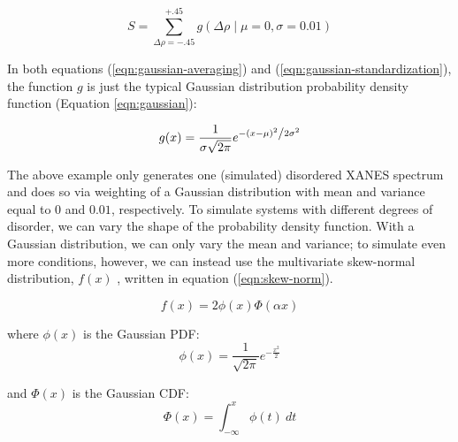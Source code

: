 \begin{equation}
	\label{eqn:gaussian-standardization}
	S = \sum_{\Delta\rho=-.45}^{+.45} g\left(\Delta \rho \mid \mu=0, \sigma=0.01\right)
\end{equation}

\noindent
In both equations (\ref{eqn:gaussian-averaging}) and (\ref{eqn:gaussian-standardization}), the function $ g $ is just the typical Gaussian distribution probability density function (Equation \ref{eqn:gaussian}): 

\begin{equation}
	\label{eqn:gaussian}
	g(x) = \frac{1}{{\sigma \sqrt {2\pi } }}e^{{{ - \left( {x - \mu } \right)^2 } \mathord{\left/ {\vphantom {{ - \left( {x - \mu } \right)^2 } {2\sigma ^2 }}} \right. \kern-\nulldelimiterspace} {2\sigma ^2 }}}
\end{equation}

The above example only generates one (simulated) disordered XANES spectrum and does so via weighting of a Gaussian distribution with mean and variance equal to $ 0 $ and $ 0.01 $, respectively. To simulate systems with different degrees of disorder, we can vary the shape of the probability density function. With a Gaussian distribution, we can only vary the mean and variance; to simulate even more conditions, however, we can instead use the multivariate skew-normal distribution, $ f(x) $ \cite{skewnorm_Azzalini_1999} \cite{2020SciPy-NMeth}, written in equation (\ref{eqn:skew-norm}). 

\begin{equation}
	\label{eqn:skew-norm}
	f(x)=2\phi (x)\Phi (\alpha x)
\end{equation}
 
\noindent
where $ \phi(x) $ is the Gaussian PDF:
\begin{equation}
	\label{eqn:skew-norm-pdf}
	\phi (x)={\frac  {1}{{\sqrt  {2\pi }}}}e^{{-{\frac  {x^{2}}{2}}}}
\end{equation}

\noindent
and $ \Phi (x) $ is the Gaussian CDF:
\begin{equation}
	\label{eqn:skew-norm-cdf}
	\Phi (x)=\int _{{-\infty }}^{{x}}\phi (t)\ dt
\end{equation}


